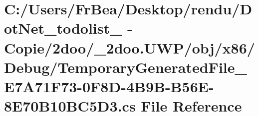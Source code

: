 \hypertarget{_u_w_p_2obj_2x86_2_debug_2_temporary_generated_file___e7_a71_f73-0_f8_d-4_b9_b-_b56_e-8_e70_b10_b_c5_d3_8cs}{
\section{C:/Users/FrBea/Desktop/rendu/DotNet\_\-todolist\_ - Copie/2doo/\_\-2doo.UWP/obj/x86/Debug/TemporaryGeneratedFile\_\-E7A71F73-0F8D-4B9B-B56E-8E70B10BC5D3.cs File Reference}
\label{_u_w_p_2obj_2x86_2_debug_2_temporary_generated_file___e7_a71_f73-0_f8_d-4_b9_b-_b56_e-8_e70_b10_b_c5_d3_8cs}
}
